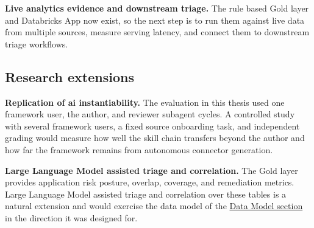 \textbf{Live analytics evidence and downstream triage.} The rule based Gold layer and Databricks App now exist, so the next step is to run them against live data from multiple sources, measure serving latency, and connect them to downstream triage workflows.

\subsection*{Research extensions}

\textbf{Replication of \gls{ai} instantiability.} The evaluation in this thesis used one framework user, the author, and reviewer subagent cycles. A controlled study with several framework users, a fixed source onboarding task, and independent grading would measure how well the skill chain transfers beyond the author and how far the framework remains from autonomous connector generation.

\textbf{Large Language Model assisted triage and correlation.} The Gold layer provides application risk posture, overlap, coverage, and remediation metrics. Large Language Model assisted triage and correlation over these tables is a natural extension and would exercise the data model of the \hyperref[sec:data-model]{Data Model section} in the direction it was designed for.
